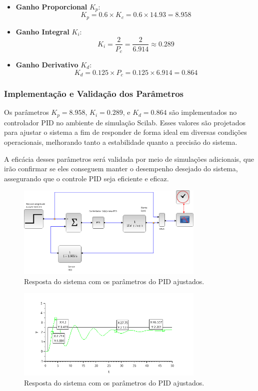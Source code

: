 \begin{itemize}
    \item \textbf{Ganho Proporcional} \( K_p \):
          \[
              K_p = 0.6 \times K_c = 0.6 \times 14.93 = 8.958
          \]
    \item \textbf{Ganho Integral} \( K_i \):
          \[
              K_i = \frac{2}{P_c} = \frac{2}{6.914} \approx 0.289
          \]
    \item \textbf{Ganho Derivativo} \( K_d \):
          \[
              K_d = 0.125 \times P_c = 0.125 \times 6.914 = 0.864
          \]
\end{itemize}

\subsubsection{Implementação e Validação dos Parâmetros}
Os parâmetros \( K_p = 8.958 \), \( K_i = 0.289 \), e \( K_d = 0.864 \) são implementados no controlador PID no ambiente de simulação Scilab. Esses valores são projetados para ajustar o sistema a fim de responder de forma ideal em diversas condições operacionais, melhorando tanto a estabilidade quanto a precisão do sistema.

A eficácia desses parâmetros será validada por meio de simulações adicionais, que irão confirmar se eles conseguem manter o desempenho desejado do sistema, assegurando que o controle PID seja eficiente e eficaz.

\begin{figure}[H]
    \centering
    \includegraphics[width=0.8\textwidth]{6-atividade/assets/a/diagrama-pid.png}
    \caption{Resposta do sistema com os parâmetros do PID ajustados.}
    \label{fig:diagrama-pid}
\end{figure}

\begin{figure}[H]
    \centering
    \includegraphics[width=0.8\textwidth]{6-atividade/assets/a/pid.png}
    \caption{Resposta do sistema com os parâmetros do PID ajustados.}
    \label{fig:resposta-pid}
\end{figure}

